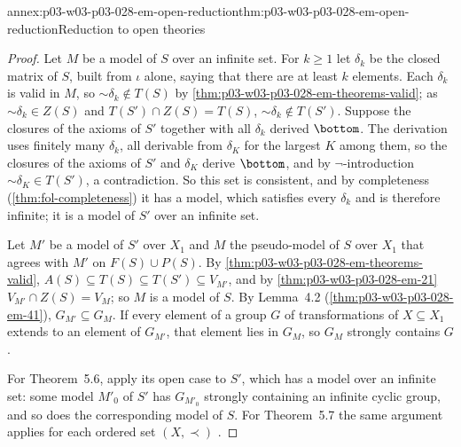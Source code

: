 \begin{annexitem}{annex:p03-w03-p03-028-em-open-reduction}{thm:p03-w03-p03-028-em-open-reduction}{Reduction to open theories}
\begin{proof}
Let \(M\) be a model of \(S\) over an infinite set.  For \(k\geq1\) let
\(\delta_k\) be the closed matrix of \(S\), built from \(\iota\) alone, saying
that there are at least \(k\) elements.  Each \(\delta_k\) is valid in \(M\), so
\(\mathord\sim\delta_k\notin T(S)\) by
\cref{thm:p03-w03-p03-028-em-theorems-valid}; as
\(\mathord\sim\delta_k\in Z(S)\) and \(T(S')\cap Z(S)=T(S)\),
\(\mathord\sim\delta_k\notin T(S')\).  Suppose the closures of the axioms of
\(S'\) together with all \(\delta_k\) derived \(\bottom\).  The derivation uses
finitely many \(\delta_k\), all derivable from \(\delta_K\) for the largest
\(K\) among them, so the closures of the axioms of \(S'\) and \(\delta_K\)
derive \(\bottom\), and by \(\neg\)-introduction \(\mathord\sim\delta_K\in
T(S')\), a contradiction.  So this set is consistent, and by completeness
(\cref{thm:fol-completeness}) it has a model, which satisfies every
\(\delta_k\) and is therefore infinite; it is a model of \(S'\) over an
infinite set.

Let \(M'\) be a model of \(S'\) over \(X_1\) and \(M\) the pseudo-model of
\(S\) over \(X_1\) that agrees with \(M'\) on \(F(S)\cup P(S)\).  By
\cref{thm:p03-w03-p03-028-em-theorems-valid}, \(A(S)\subseteq T(S)\subseteq
T(S')\subseteq V_{M'}\), and by \cref{thm:p03-w03-p03-028-em-21}
\(V_{M'}\cap Z(S)=V_M\); so \(M\) is a model of \(S\).  By Lemma~4.2
(\cref{thm:p03-w03-p03-028-em-41}), \(G_{M'}\subseteq G_M\).  If every element
of a group \(G\) of transformations of \(X\subseteq X_1\) extends to an
element of \(G_{M'}\), that element lies in \(G_M\), so \(G_M\) strongly
contains \(G\).

For Theorem~5.6, apply its open case to \(S'\), which has a model over an
infinite set: some model \(M'_0\) of \(S'\) has \(G_{M'_0}\) strongly
containing an infinite cyclic group, and so does the corresponding model of
\(S\).  For Theorem~5.7 the same argument applies for each ordered set
\((X,\prec)\) \cite[pp.~62--63]{EhrenfeuchtMostowski1956}.
\end{proof}
\end{annexitem}

